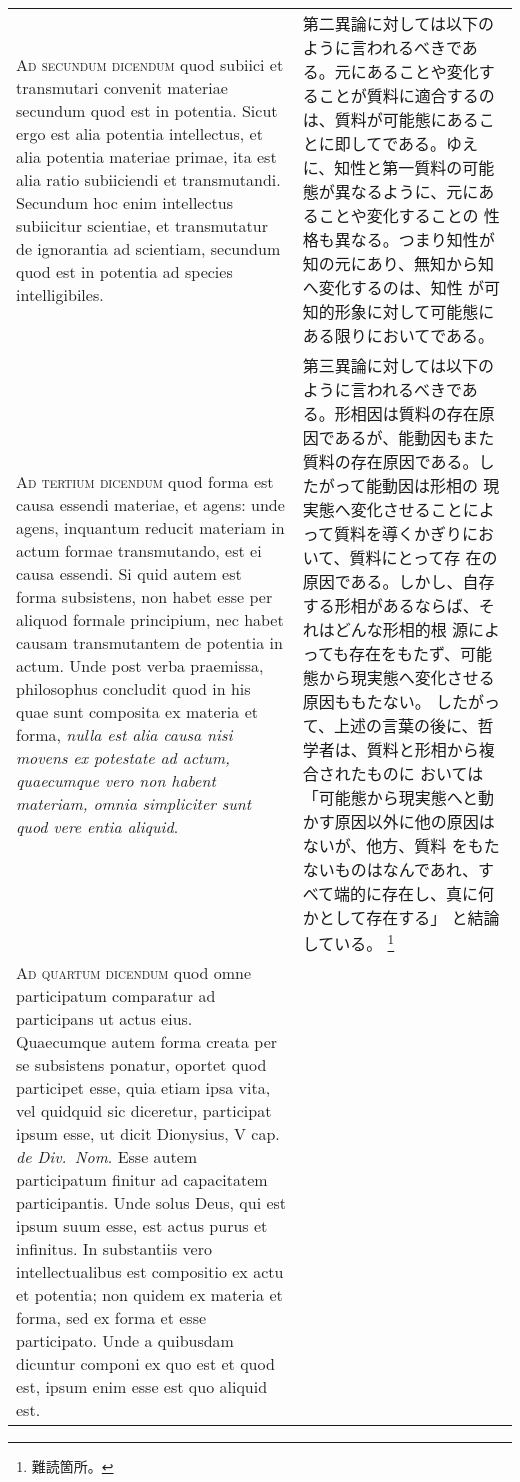 \documentclass[10pt]{jsarticle} %
\begin{document}
\begin{longtable}{p{21em}p{21em}}
\\



{\scshape Ad secundum dicendum} quod subiici et transmutari convenit
materiae secundum quod est in potentia. Sicut ergo est alia potentia
intellectus, et alia potentia materiae primae, ita est alia ratio
subiiciendi et transmutandi. Secundum hoc enim intellectus subiicitur
scientiae, et transmutatur de ignorantia ad scientiam, secundum quod
est in potentia ad species intelligibiles.


&

第二異論に対しては以下のように言われるべきである。元にあることや変化す
ることが質料に適合するのは、質料が可能態にあることに即してである。ゆえ
に、知性と第一質料の可能態が異なるように、元にあることや変化することの
性格も異なる。つまり知性が知の元にあり、無知から知へ変化するのは、知性
が可知的形象に対して可能態にある限りにおいてである。

\\



{\scshape Ad tertium dicendum} quod forma est causa essendi materiae,
et agens: unde agens, inquantum reducit materiam in actum formae
transmutando, est ei causa essendi. Si quid autem est forma
subsistens, non habet esse per aliquod formale principium, nec habet
causam transmutantem de potentia in actum. Unde post verba praemissa,
philosophus concludit quod in his quae sunt composita ex materia et
forma, {\itshape nulla est alia causa nisi movens ex potestate ad
actum, quaecumque vero non habent materiam, omnia simpliciter sunt
quod vere entia aliquid}.


&

第三異論に対しては以下のように言われるべきである。形相因は質料の存在原
因であるが、能動因もまた質料の存在原因である。したがって能動因は形相の
現実態へ変化させることによって質料を導くかぎりにおいて、質料にとって存
在の原因である。しかし、自存する形相があるならば、それはどんな形相的根
源によっても存在をもたず、可能態から現実態へ変化させる原因ももたない。
したがって、上述の言葉の後に、哲学者は、質料と形相から複合されたものに
おいては「可能態から現実態へと動かす原因以外に他の原因はないが、他方、質料
をもたないものはなんであれ、すべて端的に存在し、真に何かとして存在する」
と結論している。
\footnote{難読箇所。}

\\



{\scshape Ad quartum dicendum} quod omne participatum comparatur ad
participans ut actus eius. Quaecumque autem forma creata per se
subsistens ponatur, oportet quod participet esse, quia etiam ipsa
vita, vel quidquid sic diceretur, participat ipsum esse, ut dicit
Dionysius, V cap. {\itshape de Div.~Nom}. Esse autem participatum finitur ad
capacitatem participantis. Unde solus Deus, qui est ipsum suum esse,
est actus purus et infinitus. In substantiis vero intellectualibus est
compositio ex actu et potentia; non quidem ex materia et forma, sed ex
forma et esse participato. Unde a quibusdam dicuntur componi ex quo
est et quod est, ipsum enim esse est quo aliquid est.



\end{longtable}
\end{document}
